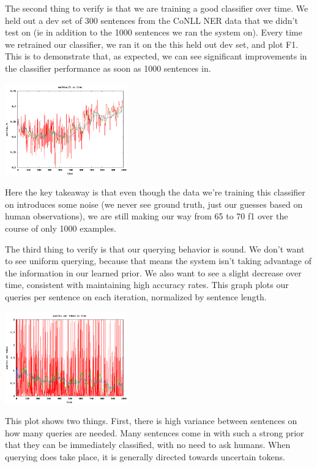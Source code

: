 The second thing to verify is that we are training a good classifier over time. We held out a dev set of 300 sentences from
the CoNLL NER data that we didn't test on (ie in addition to the 1000 sentences we ran the system on). Every time we retrained
our classifier, we ran it on the this held out dev set, and plot F1. This is to demonstrate that, as expected, we can see
significant improvements in the classifier performance as soon as 1000 sentences in.

\begin{center}
\includegraphics[width=200px]{plots/machine_f1_vs_time.png}
\end{center}

Here the key takeaway is that even though the data we're training this classifier on introduces some noise (we never see
ground truth, just our guesses based on human observations), we are still making our way from 65 to 70 f1 over the course
of only 1000 examples.

The third thing to verify is that our querying behavior is sound.
We don't want to see uniform querying, because that means the system isn't taking advantage of the information in our learned prior.
We also want to see a slight decrease over time, consistent with maintaining high accuracy rates.
This graph plots our queries per sentence on each iteration, normalized by sentence length.

\begin{center}
\includegraphics[width=200px]{plots/queries_per_token_vs_time.png}
\end{center}

This plot shows two things. First, there is high variance between sentences on how many queries are needed.
Many sentences come in with such a strong prior that they can be immediately classified, with no need to ask humans.
When querying does take place, it is generally directed towards uncertain tokens.

